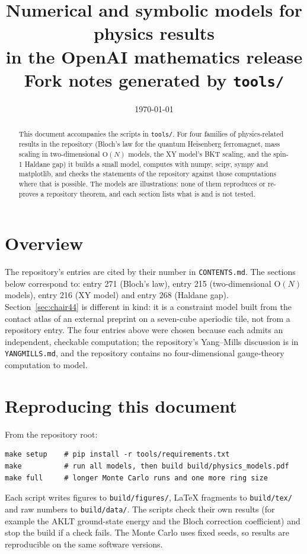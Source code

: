 \documentclass[11pt]{article}
\title{Numerical and symbolic models for physics results\\in the OpenAI mathematics release\\[0.2em]\large Fork notes generated by \texttt{tools/}}
\date{\today}
\author{}
\begin{document}
\maketitle

\begin{abstract}
This document accompanies the scripts in \texttt{tools/}. For four families of physics-related results in the repository
(Bloch's law for the quantum Heisenberg ferromagnet, mass scaling in two-dimensional $\mathrm{O}(N)$ models, the XY model's BKT
scaling, and the spin-1 Haldane gap) it builds a small model, computes with numpy, scipy, sympy and matplotlib, and checks the
statements of the repository against those computations where that is possible. The models are illustrations: none of them reproduces
or re-proves a repository theorem, and each section lists what is and is not tested.
\end{abstract}

\section{Overview}

The repository's entries are cited by their number in \texttt{CONTENTS.md}. The sections below correspond to:
entry 271 (Bloch's law), entry 215 (two-dimensional $\mathrm{O}(N)$ models), entry 216 (XY model) and entry 268 (Haldane gap).
Section~\ref{sec:chair44} is different in kind: it is a constraint model built from the contact atlas of an external preprint on a seven-cube aperiodic tile, not from a repository entry. The four entries above were chosen because each admits an independent, checkable computation; the repository's Yang--Mills discussion is
in \texttt{YANGMILLS.md}, and the repository contains no four-dimensional gauge-theory computation to model.









\section{Reproducing this document}
\label{sec:repro}

From the repository root:
\begin{verbatim}
make setup    # pip install -r tools/requirements.txt
make          # run all models, then build build/physics_models.pdf
make full     # longer Monte Carlo runs and one more ring size
\end{verbatim}
Each script writes figures to \texttt{build/figures/}, LaTeX fragments to \texttt{build/tex/} and raw numbers to \texttt{build/data/}.
The scripts check their own results (for example the AKLT ground-state energy and the Bloch correction coefficient) and stop the build if
a check fails. The Monte Carlo uses fixed seeds, so results are reproducible on the same software versions.
\end{document}

